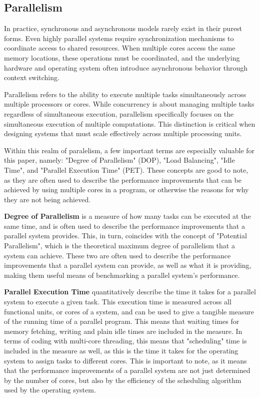 \documentclass[12pt,a4paper]{article}
\begin{document}
\subsection{Parallelism}

In practice, synchronous and asynchronous models rarely exist in their purest forms. Even highly parallel systems require synchronization mechanisms to coordinate access to shared resources\parencite[p. 95]{Rauber2023}. When multiple cores access the same memory locations, these operations must be coordinated, and the underlying hardware and operating system often introduce asynchronous behavior through context switching.

Parallelism refers to the ability to execute multiple tasks simultaneously across multiple processors or cores\parencite[pp. 4-5]{Rauber2023}. While concurrency is about managing multiple tasks regardless of simultaneous execution, parallelism specifically focuses on the simultaneous execution of multiple computations. This distinction is critical when designing systems that must scale effectively across multiple processing units.

Within this realm of paralelism, a few important terms are especially valuable for this paper, namely: "Degree of Parallelism" (DOP)\parencite[pp. 11-13]{Rauber2023}, "Load Balancing"\parencite[p. 5]{Rauber2023}, "Idle Time"\parencite[p. 5]{Rauber2023}, and "Parallel Execution Time" (PET)\parencite[p. 5]{Rauber2023}. These concepts are good to note, as they are often used to describe the performance improvements that can be achieved by using multiple cores in a program, or otherwise the reasons for why they are not being achieved.

\textbf{Degree of Parallelism} is a measure of how many tasks can be executed at the same time, and is often used to describe the performance improvements that a parallel system provides. This, in turn, coincides with the concept of "Potential Parallelism", which is the theoretical maximum degree of parallelism that a system can achieve. These two are often used to describe the performance improvements that a parallel system can provide, as well as what it is providing, making them useful means of benchmarking a parallel system's performance.

\textbf{Parallel Execution Time} quantitatively describe the time it takes for a parallel system to execute a given task. This execution time is measured across all functional units, or cores of a system, and can be used to give a tangible measure of the running time of a parallel program. This means that waiting times for memory fetching, writing and plain idle times are included in the measure. In terms of coding with multi-core threading, this means that "scheduling" time is included in the measure as well, as this is the time it takes for the operating system to assign tasks to different cores. This is important to note, as it means that the performance improvements of a parallel system are not just determined by the number of cores, but also by the efficiency of the scheduling algorithm used by the operating system.
\end{document}
